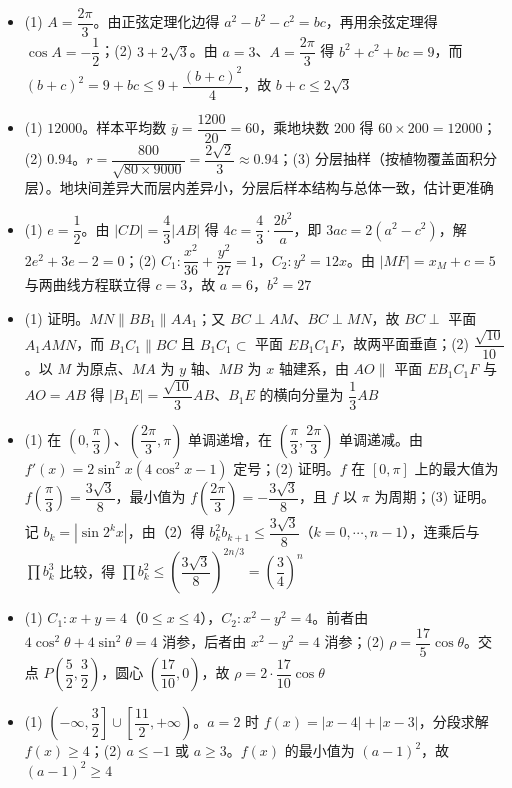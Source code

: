 \begin{itemize}[leftmargin=2.6em]
  \item[\textbf{17.}] (1) $A=\dfrac{2\pi}3$。由正弦定理化边得 $a^2-b^2-c^2=bc$，再用余弦定理得 $\cos A=-\dfrac12$；(2) $3+2\sqrt3$。由 $a=3$、$A=\dfrac{2\pi}3$ 得 $b^2+c^2+bc=9$，而 $(b+c)^2=9+bc\leqslant9+\dfrac{(b+c)^2}4$，故 $b+c\leqslant2\sqrt3$
  \item[\textbf{18.}] (1) $12000$。样本平均数 $\bar y=\dfrac{1200}{20}=60$，乘地块数 $200$ 得 $60\times200=12000$；(2) $0.94$。$r=\dfrac{800}{\sqrt{80\times9000}}=\dfrac{2\sqrt2}3\approx0.94$；(3) 分层抽样（按植物覆盖面积分层）。地块间差异大而层内差异小，分层后样本结构与总体一致，估计更准确
  \item[\textbf{19.}] (1) $e=\dfrac12$。由 $|CD|=\dfrac43|AB|$ 得 $4c=\dfrac43\cdot\dfrac{2b^2}a$，即 $3ac=2(a^2-c^2)$，解 $2e^2+3e-2=0$；(2) $C_1:\dfrac{x^2}{36}+\dfrac{y^2}{27}=1$，$C_2:y^2=12x$。由 $|MF|=x_M+c=5$ 与两曲线方程联立得 $c=3$，故 $a=6$，$b^2=27$
  \item[\textbf{20.}] (1) 证明。$MN\parallel BB_1\parallel AA_1$；又 $BC\perp AM$、$BC\perp MN$，故 $BC\perp$ 平面 $A_1AMN$，而 $B_1C_1\parallel BC$ 且 $B_1C_1\subset$ 平面 $EB_1C_1F$，故两平面垂直；(2) $\dfrac{\sqrt{10}}{10}$。以 $M$ 为原点、$MA$ 为 $y$ 轴、$MB$ 为 $x$ 轴建系，由 $AO\parallel$ 平面 $EB_1C_1F$ 与 $AO=AB$ 得 $|B_1E|=\dfrac{\sqrt{10}}3AB$、$B_1E$ 的横向分量为 $\dfrac13AB$
  \item[\textbf{21.}] (1) 在 $\left(0,\dfrac\pi3\right)$、$\left(\dfrac{2\pi}3,\pi\right)$ 单调递增，在 $\left(\dfrac\pi3,\dfrac{2\pi}3\right)$ 单调递减。由 $f'(x)=2\sin^2x(4\cos^2x-1)$ 定号；(2) 证明。$f$ 在 $[0,\pi]$ 上的最大值为 $f\left(\dfrac\pi3\right)=\dfrac{3\sqrt3}8$，最小值为 $f\left(\dfrac{2\pi}3\right)=-\dfrac{3\sqrt3}8$，且 $f$ 以 $\pi$ 为周期；(3) 证明。记 $b_k=|\sin2^kx|$，由（2）得 $b_k^2b_{k+1}\leqslant\dfrac{3\sqrt3}8$（$k=0,\cdots,n-1$），连乘后与 $\prod b_k^3$ 比较，得 $\prod b_k^2\leqslant\left(\dfrac{3\sqrt3}8\right)^{2n/3}=\left(\dfrac34\right)^n$
\end{itemize}

\begin{itemize}[leftmargin=2.6em]
  \item[\textbf{22.}] (1) $C_1:x+y=4$（$0\leqslant x\leqslant4$），$C_2:x^2-y^2=4$。前者由 $4\cos^2\theta+4\sin^2\theta=4$ 消参，后者由 $x^2-y^2=4$ 消参；(2) $\rho=\dfrac{17}5\cos\theta$。交点 $P\left(\dfrac52,\dfrac32\right)$，圆心 $\left(\dfrac{17}{10},0\right)$，故 $\rho=2\cdot\dfrac{17}{10}\cos\theta$
  \item[\textbf{23.}] (1) $\left(-\infty,\dfrac32\right]\cup\left[\dfrac{11}2,+\infty\right)$。$a=2$ 时 $f(x)=|x-4|+|x-3|$，分段求解 $f(x)\geqslant4$；(2) $a\leqslant-1$ 或 $a\geqslant3$。$f(x)$ 的最小值为 $(a-1)^2$，故 $(a-1)^2\geqslant4$
\end{itemize}
